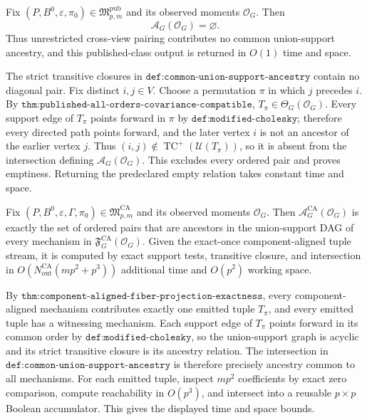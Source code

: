 Fix \((P,B^0,\varepsilon,\pi_0)\in\mathfrak M_{p,m}^{\mathrm{pub}}\) and its observed moments \(\mathcal O_G\).  Then
\[
 \mathcal A_G(\mathcal O_G)=\varnothing.
\]
Thus unrestricted cross-view pairing contributes no common union-support ancestry, and this published-class output is returned in \(O(1)\) time and space.

The strict transitive closures in \(\texttt{def:common-union-support-ancestry}\) contain no diagonal pair.  Fix distinct \(i,j\in V\).  Choose a permutation \(\pi\) in which \(j\) precedes \(i\).  By \(\texttt{thm:published-all-orders-covariance-compatible}\), \(T_\pi\in\Theta_G(\mathcal O_G)\).  Every support edge of \(T_\pi\) points forward in \(\pi\) by \(\texttt{def:modified-cholesky}\); therefore every directed path points forward, and the later vertex \(i\) is not an ancestor of the earlier vertex \(j\).  Thus \((i,j)\notin\operatorname{TC}^{+}(\mathcal U(T_\pi))\), so it is absent from the intersection defining \(\mathcal A_G(\mathcal O_G)\).  This excludes every ordered pair and proves emptiness.  Returning the predeclared empty relation takes constant time and space.

Fix \((P,B^0,\varepsilon,\Gamma,\pi_0)\in\mathfrak M_{p,m}^{\mathrm{CA}}\) and its observed moments \(\mathcal O_G\).  Then \(\mathcal A_G^{\mathrm{CA}}(\mathcal O_G)\) is exactly the set of ordered pairs that are ancestors in the union-support DAG of every mechanism in \(\mathfrak F_G^{\mathrm{CA}}(\mathcal O_G)\).  Given the exact-once component-aligned tuple stream, it is computed by exact support tests, transitive closure, and intersection in \(O(N_{\mathrm{out}}^{\mathrm{CA}}(mp^2+p^3))\) additional time and \(O(p^2)\) working space.

By \(\texttt{thm:component-aligned-fiber-projection-exactness}\), every component-aligned mechanism contributes exactly one emitted tuple \(T_\pi\), and every emitted tuple has a witnessing mechanism.  Each support edge of \(T_\pi\) points forward in its common order by \(\texttt{def:modified-cholesky}\), so the union-support graph is acyclic and its strict transitive closure is its ancestry relation.  The intersection in \(\texttt{def:common-union-support-ancestry}\) is therefore precisely ancestry common to all mechanisms.  For each emitted tuple, inspect \(mp^2\) coefficients by exact zero comparison, compute reachability in \(O(p^3)\), and intersect into a reusable \(p\times p\) Boolean accumulator.  This gives the displayed time and space bounds.

